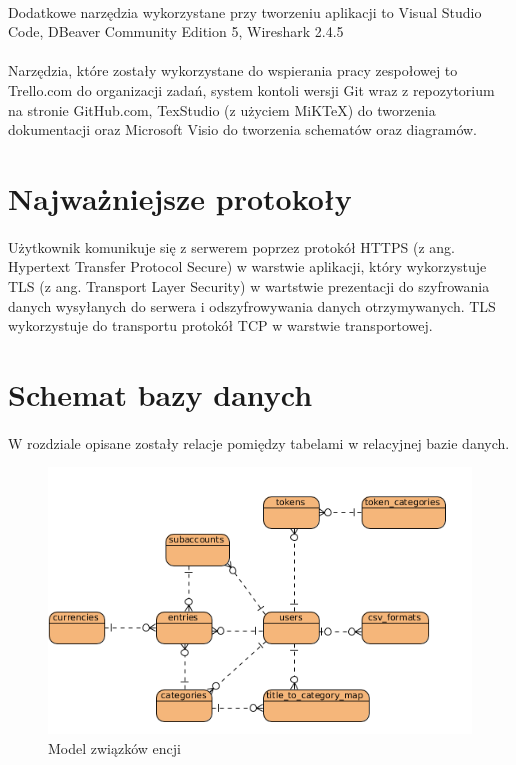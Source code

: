 \documentclass{article}
\begin{document}
	\paragraph*{} Dodatkowe narzędzia wykorzystane przy tworzeniu aplikacji to Visual Studio Code, DBeaver Community Edition 5, Wireshark 2.4.5
	\paragraph*{} Narzędzia, które zostały wykorzystane do wspierania pracy zespołowej to Trello.com do organizacji zadań, system kontoli wersji Git wraz z repozytorium na stronie GitHub.com, TexStudio (z użyciem MiKTeX) do tworzenia dokumentacji oraz Microsoft Visio do tworzenia schematów oraz diagramów.
	\section{Najważniejsze protokoły}
	\paragraph*{}
	Użytkownik komunikuje się z serwerem poprzez protokół HTTPS (z ang. Hypertext Transfer Protocol Secure) w warstwie aplikacji, który wykorzystuje TLS (z ang. Transport Layer Security) w wartstwie prezentacji do szyfrowania danych wysyłanych do serwera i odszyfrowywania danych otrzymywanych. TLS wykorzystuje do transportu protokół TCP w warstwie transportowej.
	\section{Schemat bazy danych}
	\paragraph{} W rozdziale opisane zostały relacje pomiędzy tabelami w relacyjnej bazie danych.
	\begin{figure}[H]
		\centering
		\includegraphics[width=0.8\linewidth]{assets/erd.png}
		\caption[]{Model związków encji}
		\label{fig:erd}
	\end{figure}
\end{document}
